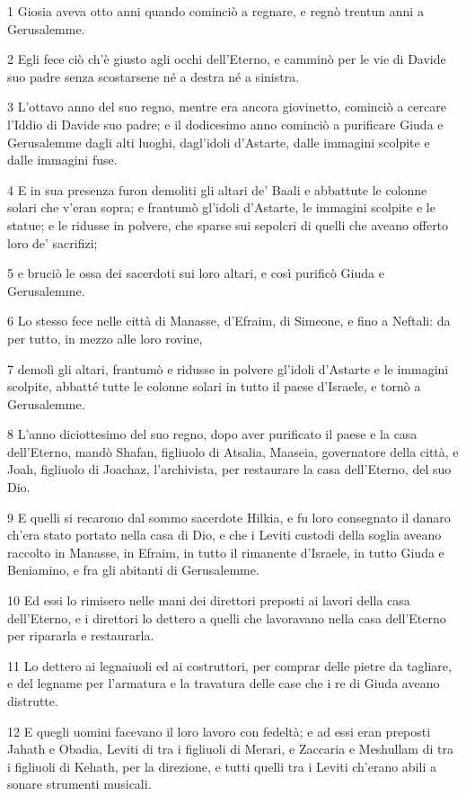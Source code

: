 \par 1 Giosia aveva otto anni quando cominciò a regnare, e regnò trentun anni a Gerusalemme.
\par 2 Egli fece ciò ch'è giusto agli occhi dell'Eterno, e camminò per le vie di Davide suo padre senza scostarsene né a destra né a sinistra.
\par 3 L'ottavo anno del suo regno, mentre era ancora giovinetto, cominciò a cercare l'Iddio di Davide suo padre; e il dodicesimo anno cominciò a purificare Giuda e Gerusalemme dagli alti luoghi, dagl'idoli d'Astarte, dalle immagini scolpite e dalle immagini fuse.
\par 4 E in sua presenza furon demoliti gli altari de' Baali e abbattute le colonne solari che v'eran sopra; e frantumò gl'idoli d'Astarte, le immagini scolpite e le statue; e le ridusse in polvere, che sparse sui sepolcri di quelli che aveano offerto loro de' sacrifizi;
\par 5 e bruciò le ossa dei sacerdoti sui loro altari, e così purificò Giuda e Gerusalemme.
\par 6 Lo stesso fece nelle città di Manasse, d'Efraim, di Simeone, e fino a Neftali: da per tutto, in mezzo alle loro rovine,
\par 7 demolì gli altari, frantumò e ridusse in polvere gl'idoli d'Astarte e le immagini scolpite, abbatté tutte le colonne solari in tutto il paese d'Israele, e tornò a Gerusalemme.
\par 8 L'anno diciottesimo del suo regno, dopo aver purificato il paese e la casa dell'Eterno, mandò Shafan, figliuolo di Atsalia, Maaseia, governatore della città, e Joah, figliuolo di Joachaz, l'archivista, per restaurare la casa dell'Eterno, del suo Dio.
\par 9 E quelli si recarono dal sommo sacerdote Hilkia, e fu loro consegnato il danaro ch'era stato portato nella casa di Dio, e che i Leviti custodi della soglia aveano raccolto in Manasse, in Efraim, in tutto il rimanente d'Israele, in tutto Giuda e Beniamino, e fra gli abitanti di Gerusalemme.
\par 10 Ed essi lo rimisero nelle mani dei direttori preposti ai lavori della casa dell'Eterno, e i direttori lo dettero a quelli che lavoravano nella casa dell'Eterno per ripararla e restaurarla.
\par 11 Lo dettero ai legnaiuoli ed ai costruttori, per comprar delle pietre da tagliare, e del legname per l'armatura e la travatura delle case che i re di Giuda aveano distrutte.
\par 12 E quegli uomini facevano il loro lavoro con fedeltà; e ad essi eran preposti Jahath e Obadia, Leviti di tra i figliuoli di Merari, e Zaccaria e Meshullam di tra i figliuoli di Kehath, per la direzione, e tutti quelli tra i Leviti ch'erano abili a sonare strumenti musicali.
